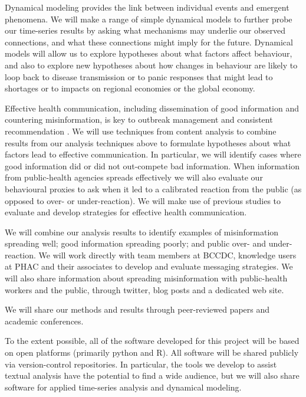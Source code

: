  Dynamical modeling provides the link between individual events and emergent phenomena. We will make a range of simple dynamical models to further probe our time-series results by asking what mechanisms may underlie our observed connections, and what these connections might imply for the future. Dynamical models will allow us to explore hypotheses about what factors affect behaviour, and also to explore new hypotheses about how changes in behaviour are likely to loop back to disease transmission or to panic responses that might lead to shortages or to impacts on regional economies or the global economy.


Effective health communication, including dissemination of good information and countering misinformation, is key to outbreak management \citep{SongSong17} and consistent recommendation \citep{OhlrSugg18,SongSong17}.
We will use techniques from content analysis to combine results from our analysis techniques above to formulate hypotheses about what factors lead to effective communication. In particular, we will identify cases where good information did or did not out-compete bad information. When information from public-health agencies spreads effectively we will also evaluate our behavioural proxies to ask when it led to a calibrated reaction from the public (as opposed to over- or under-reaction).
We will make use of previous studies to evaluate \citep{Ding14,FarmSher18,NowaShee15,Tam18} and develop \citep{BekaBigm18, ShenShee15, SongSong17} strategies for effective health communication.


 We will combine our analysis results to identify examples of misinformation spreading well; good information spreading poorly; and public over- and under-reaction. We will work directly with team members at BCCDC, knowledge users at PHAC and their associates to develop and evaluate messaging strategies. We will also share information about spreading misinformation with public-health workers and the public, through twitter, blog posts and a dedicated web site. 

 We will share our methods and results through peer-reviewed papers and academic conferences. 

 To the extent possible, all of the software developed for this project will be based on open platforms (primarily python and R). All software will be shared publicly via version-control repositories. In particular, the tools we develop to assist textual analysis have the potential to find a wide audience, but we will also share software for applied time-series analysis and dynamical modeling.

